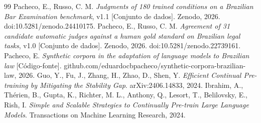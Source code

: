 \documentclass{IOS-Book-Article}
\begin{document}
\begin{thebibliography}{99}
 Pacheco, E., Russo, C. M. \emph{Judgments of 180 trained conditions on a Brazilian Bar Examination benchmark}, v1.1 [Conjunto de dados]. Zenodo, 2026. doi:10.5281/zenodo.24410175.
 Pacheco, E., Russo, C. M. \emph{Agreement of 31 candidate automatic judges against a human gold standard on Brazilian legal tasks}, v1.0 [Conjunto de dados]. Zenodo, 2026. doi:10.5281/zenodo.22739161.
 Pacheco, E. \emph{Synthetic corpora in the adaptation of language models to Brazilian law} [Código-fonte]. github.com/eduardocbpacheco/synthetic-corpora-brazilian-law, 2026.
 Guo, Y., Fu, J., Zhang, H., Zhao, D., Shen, Y. \emph{Efficient Continual Pre-training by Mitigating the Stability Gap}. arXiv:2406.14833, 2024.
 Ibrahim, A., Thérien, B., Gupta, K., Richter, M. L., Anthony, Q., Lesort, T., Belilovsky, E., Rish, I. \emph{Simple and Scalable Strategies to Continually Pre-train Large Language Models}. Transactions on Machine Learning Research, 2024.
\end{thebibliography}
\end{document}
